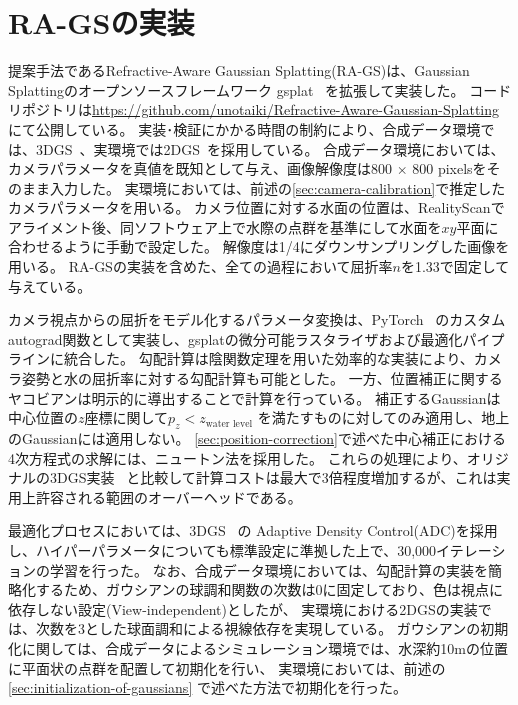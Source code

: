 \newpage
\section{RA-GSの実装}\label{sec:implementation}


提案手法であるRefractive-Aware Gaussian Splatting(RA-GS)は、Gaussian Splattingのオープンソースフレームワーク gsplat~\cite{ye2025_gsplat} を拡張して実装した。
コードリポジトリは\url{https://github.com/unotaiki/Refractive-Aware-Gaussian-Splatting}にて公開している。
実装･検証にかかる時間の制約により、合成データ環境では、3DGS~\cite{Kerbl2023ToG_3DGS}、実環境では2DGS~\cite{Huang2024SIGGRAPH_2DGS}を採用している。
合成データ環境においては、カメラパラメータを真値を既知として与え、画像解像度は800 $\times$ 800 pixelsをそのまま入力した。
実環境においては、前述の\cref{sec:camera-calibration}で推定したカメラパラメータを用いる。
カメラ位置に対する水面の位置は、RealityScanでアライメント後、同ソフトウェア上で水際の点群を基準にして水面を$xy$平面に合わせるように手動で設定した。
解像度は1/4にダウンサンプリングした画像を用いる。
RA-GSの実装を含めた、全ての過程において屈折率$n$を1.33で固定して与えている。

カメラ視点からの屈折をモデル化するパラメータ変換は、PyTorch~\cite{paszke2019pytorch} のカスタムautograd関数として実装し、gsplatの微分可能ラスタライザおよび最適化パイプラインに統合した。
勾配計算は陰関数定理を用いた効率的な実装により、カメラ姿勢と水の屈折率に対する勾配計算も可能とした。
一方、位置補正に関するヤコビアンは明示的に導出することで計算を行っている。
補正するGaussianは中心位置の$z$座標に関して$p_z < z_\text{water level}$ を満たすものに対してのみ適用し、地上のGaussianには適用しない。
\cref{sec:position-correction}で述べた中心補正における4次方程式の求解には、ニュートン法を採用した。
これらの処理により、オリジナルの3DGS実装~\cite{Kerbl2023ToG_3DGS} と比較して計算コストは最大で3倍程度増加するが、これは実用上許容される範囲のオーバーヘッドである。

最適化プロセスにおいては、3DGS~\cite{Kerbl2023ToG_3DGS} の Adaptive Density Control(ADC)を採用し、ハイパーパラメータについても標準設定に準拠した上で、30,000イテレーションの学習を行った。 
なお、合成データ環境においては、勾配計算の実装を簡略化するため、ガウシアンの球調和関数の次数は0に固定しており、色は視点に依存しない設定(View-independent)としたが、
実環境における2DGSの実装では、次数を3とした球面調和による視線依存を実現している。 
ガウシアンの初期化に関しては、合成データによるシミュレーション環境では、水深約10mの位置に平面状の点群を配置して初期化を行い、
実環境においては、前述の\cref{sec:initialization-of-gaussians} で述べた方法で初期化を行った。

